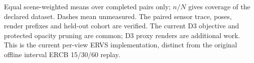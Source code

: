 \begin{table}[tbp]
\centering
\caption{Current merged mapper: RR versus cumulative-count ERVS with in-between RGB supervision.}
\label{tab:current_sampling}
\begingroup
\footnotesize
\setlength{\tabcolsep}{2.5pt}
\renewcommand{\arraystretch}{1.04}
\endgroup
\par\vspace{3pt}
\begin{minipage}{\linewidth}
\scriptsize\raggedright Equal scene-weighted means over completed pairs only; $n/N$ gives coverage of the declared dataset. Dashes mean unmeasured. The paired sensor trace, poses, render prefixes and held-out cohort are verified. The current D3 objective and protected opacity pruning are common; D3 proxy renders are additional work. This is the current per-view ERVS implementation, distinct from the original offline interval ERCB 15/30/60 replay.
\end{minipage}
\end{table}
